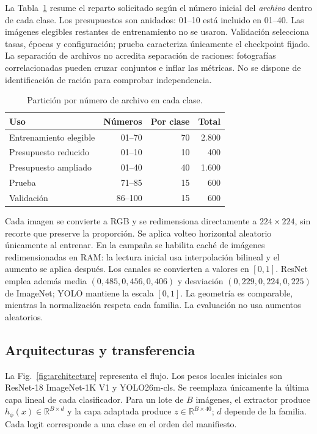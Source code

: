 \documentclass[conference]{IEEEtran}
\begin{document}
La Tabla~\ref{tab:data} resume el reparto solicitado según el número inicial del \emph{archivo} dentro de cada clase. Los presupuestos son anidados: 01--10 está incluido en 01--40. Las imágenes elegibles restantes de entrenamiento no se usaron. Validación selecciona tasas, épocas y configuración; prueba caracteriza únicamente el checkpoint fijado. La separación de archivos no acredita separación de raciones: fotografías correlacionadas pueden cruzar conjuntos e inflar las métricas. No se dispone de identificación de ración para comprobar independencia.

\begin{table}[t]
\caption{Partición por número de archivo en cada clase.}
\label{tab:data}\centering\small
\begin{tabular}{lrrr}\toprule
Uso & Números & Por clase & Total\\\midrule
Entrenamiento elegible & 01--70 & 70 & 2.800\\
Presupuesto reducido & 01--10 & 10 & 400\\
Presupuesto ampliado & 01--40 & 40 & 1.600\\
Prueba & 71--85 & 15 & 600\\
Validación & 86--100 & 15 & 600\\\bottomrule
\end{tabular}
\end{table}

Cada imagen se convierte a RGB y se redimensiona directamente a $224\times224$, sin recorte que preserve la proporción. Se aplica volteo horizontal aleatorio únicamente al entrenar. En la campaña se habilita caché de imágenes redimensionadas en RAM: la lectura inicial usa interpolación bilineal y el aumento se aplica después. Los canales se convierten a valores en $[0,1]$. ResNet emplea además media $(0{,}485,0{,}456,0{,}406)$ y desviación $(0{,}229,0{,}224,0{,}225)$ de ImageNet; YOLO mantiene la escala $[0,1]$. La geometría es comparable, mientras la normalización respeta cada familia. La evaluación no usa aumentos aleatorios.

\subsection{Arquitecturas y transferencia}
La Fig.~\ref{fig:architecture} representa el flujo. Los pesos locales iniciales son ResNet-18 ImageNet-1K V1 y YOLO26m-cls. Se reemplaza únicamente la última capa lineal de cada clasificador. Para un lote de $B$ imágenes, el extractor produce $h_\phi(x)\in\mathbb{R}^{B\times d}$ y la capa adaptada produce $z\in\mathbb{R}^{B\times40}$; $d$ depende de la familia. Cada logit corresponde a una clase en el orden del manifiesto.
\end{document}
